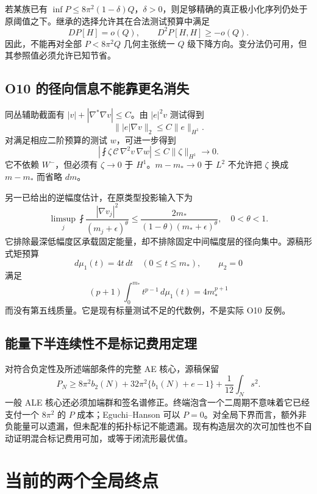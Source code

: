 \documentclass[UTF8,11pt,fontset=none]{ctexart}
\theoremstyle{definition}
\theoremstyle{remark}
\begin{document}
若某族已有 \(\inf P\le8\pi^2(1-\delta)Q\)，\(\delta>0\)，则足够精确的真正极小化序列仍处于原阈值之下。继承的选择允许其在合法测试预算中满足 \[
 DP[H]=o(Q),\qquad D^2P[H,H]\ge-o(Q).
\] 因此，不能再对全部 \(P<8\pi^2Q\) 几何主张统一 \(Q\) 级下降方向。变分法仍可用，但其参照值必须允许已知节省。\cite{I06,B01}

\subsection{O10 的径向信息不能靠更名消失}\label{v7-o10-ux7684ux5f84ux5411ux4fe1ux606fux4e0dux80fdux9760ux66f4ux540dux6d88ux5931}

同丛辅助截面有 \(|v|+|\nabla^*\nabla v|\le C\)。由 \(|e|^2v\) 测试得到 \[
 \||e|\nabla v\|_2\le C\|e\|_{H^1}.
\] 对满足相应二阶预算的测试 \(w\)，可进一步得到 \[
 \left|\fint\zeta\,\mathcal C\,\nabla^2v\,\nabla w\right|
 \le C\|\zeta\|_{H^1}\to0.
\tag{7.9}
\] 它不依赖 \(W^-\)，但必须有 \(\zeta\to0\) 于 \(H^1\)。\(m-m_*\to0\) 于 \(L^2\) 不允许把 \(\zeta\) 换成 \(m-m_*\) 而省略 \(dm\)。\cite{I03}

另一已给出的逆幅度估计，在原类型投影输入下为 \[
 \limsup_j\fint\frac{|\nabla v_j|^2}{(m_j+\epsilon)^\theta}
 \le\frac{2m_*}{(1-\theta)(m_*+\epsilon)^\theta},\quad0<\theta<1.
\] 它排除最深低幅度区承载固定能量，却不排除固定中间幅度层的径向集中。源稿形式矩预算 \[
 d\mu_1(t)=4t\,dt\quad(0\le t\le m_*),\qquad\mu_2=0
\] 满足 \[
 (p+1)\int_0^{m_*}t^{p-1}\,d\mu_1(t)=4m_*^{p+1}
\] 而没有第五线质量。它是现有标量测试不足的代数例，不是实际 O10 反例。\cite{I04,I05}

\subsection{能量下半连续性不是标记费用定理}\label{v7-ux80fdux91cfux4e0bux534aux8fdeux7eedux6027ux4e0dux662fux6807ux8bb0ux8d39ux7528ux5b9aux7406}

对符合负定性及所述端部条件的完整 AE 核心，源稿保留 \[
 P_N\ge8\pi^2b_2(N)+32\pi^2\{b_1(N)+e-1\}
 +\frac1{12}\int_Ns^2.
\] 一般 ALE 核心还必须加端群和签名谱修正。终端泡含一个二周期不意味着它已经支付一个 \(8\pi^2\) 的 \(P\) 成本；Eguchi--Hanson 可以 \(P=0\)。对全局下界而言，额外非负能量可以遗漏，但未配准的拓扑标记不能遗漏。现有构造层次的次可加性也不自动证明混合标记费用可加，或等于闭流形最优值。\cite{I05,B02}

\section{当前的两个全局终点}\label{v7-ux5f53ux524dux7684ux4e24ux4e2aux5168ux5c40ux7ec8ux70b9}
\end{document}
